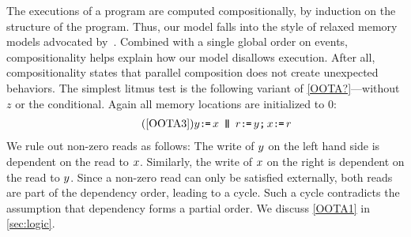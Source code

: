 The executions of a program are computed compositionally, by induction on the
structure of the program.  Thus, our model falls into the style of relaxed
memory models advocated by~\citet{Batty17}.  Combined with a single global
order on events, compositionality helps explain how our model disallows
\oota{} execution.  After all, compositionality states that parallel
composition does not create unexpected
behaviors.  %
The simplest \oota{} litmus test is the following variant of \eqref{OOTA?}---without $z$ or
the conditional.  Again all memory locations are initialized to $0$:
\begin{gather*}
  \tag{\ref{OOTA3}}
  \bLoc \GETS \aLoc \PAR r\GETS y\SEMI x\GETS r  
\end{gather*}
We rule out non-zero reads as follows: The write of $y$ on the left hand
side is dependent on the read to $x$.  Similarly, the write of $x$ on
the right is dependent on the read to $y$.  Since a non-zero read can
only be satisfied externally, both reads are part of the dependency order,
leading to a cycle.  Such a cycle contradicts the assumption that dependency
forms a partial order.  We discuss \ref{OOTA1} in \textsection\ref{sec:logic}.









